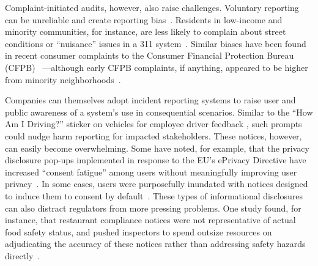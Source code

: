 \documentclass[sigconf]{acmart}
\begin{document}
Complaint-initiated audits, however, also raise challenges. Voluntary reporting can be unreliable and create reporting bias~\cite{altenburger2019algorithms}. Residents in low-income and minority communities, for instance, are less likely to complain about street conditions or “nuisance” issues in a 311 system~\cite{kontokosta2021bias}. Similar biases have been found in recent consumer complaints to the Consumer Financial Protection Bureau (CFPB)~ \cite{porter2012complaint}—although early CFPB complaints, if anything, appeared to be higher from minority neighborhoods~\cite{ayres2013skeletons}.

Companies can themselves adopt incident reporting systems to raise user and public awareness of a system’s use in consequential scenarios. Similar to the “How Am I Driving?” sticker on vehicles for employee driver feedback \cite{strahilevitz2006s}, such prompts could nudge harm reporting for impacted stakeholders. These notices, however, can easily become overwhelming. Some have noted, for example, that the privacy disclosure pop-ups implemented in response to the EU's ePrivacy Directive have increased “consent fatigue” among users without meaningfully improving user privacy~\cite{sanchez2019can,trevisan20194}. In some cases, users were purposefully inundated with notices designed to induce them to consent by default~\cite{soe2020circumvention,nouwens2020dark,matte2020cookie,miyazaki2008online}. These types of informational disclosures can also distract regulators from more pressing problems. One study found, for instance, that restaurant compliance notices were not representative of actual food safety status, and pushed inspectors to spend outsize resources on adjudicating the accuracy of these notices rather than addressing safety hazards directly~\cite{ho2012fudging}. 
\end{document}
